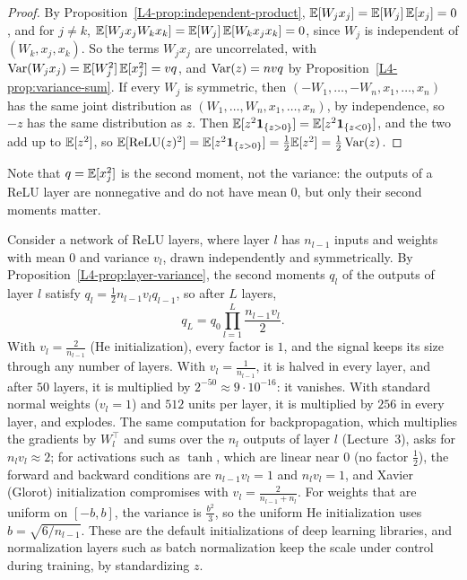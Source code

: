 \begin{proof}
    By Proposition~\ref{L4-prop:independent-product}, $\mathbb{E}[W_jx_j] = \mathbb{E}[W_j]\,\mathbb{E}[x_j] = 0$, and for $j \neq k$, $\mathbb{E}[W_jx_jW_kx_k] = \mathbb{E}[W_j]\,\mathbb{E}[W_kx_jx_k] = 0$, since $W_j$ is independent of $(W_k, x_j, x_k)$. So the terms $W_jx_j$ are uncorrelated, with $\operatorname{Var}(W_jx_j) = \mathbb{E}[W_j^2]\,\mathbb{E}[x_j^2] = vq$, and $\operatorname{Var}(z) = nvq$ by Proposition~\ref{L4-prop:variance-sum}. If every $W_j$ is symmetric, then $(-W_1, \ldots, -W_n, x_1, \ldots, x_n)$ has the same joint distribution as $(W_1, \ldots, W_n, x_1, \ldots, x_n)$, by independence, so $-z$ has the same distribution as $z$. Then $\mathbb{E}[z^2\mathbf{1}_{\{z > 0\}}] = \mathbb{E}[z^2\mathbf{1}_{\{z < 0\}}]$, and the two add up to $\mathbb{E}[z^2]$, so $\mathbb{E}[\mathrm{ReLU}(z)^2] = \mathbb{E}[z^2\mathbf{1}_{\{z > 0\}}] = \frac{1}{2}\mathbb{E}[z^2] = \frac{1}{2}\operatorname{Var}(z)$.
\end{proof}

Note that $q = \mathbb{E}[x_j^2]$ is the second moment, not the variance: the outputs of a ReLU layer are nonnegative and do not have mean $0$, but only their second moments matter.

\begin{example}\label{L4-ex:initialization}
    Consider a network of ReLU layers, where layer $l$ has $n_{l-1}$ inputs and weights with mean $0$ and variance $v_l$, drawn independently and symmetrically. By Proposition~\ref{L4-prop:layer-variance}, the second moments $q_l$ of the outputs of layer $l$ satisfy $q_l = \frac{1}{2}n_{l-1}v_lq_{l-1}$, so after $L$ layers,
    \[q_L = q_0\prod_{l=1}^L \frac{n_{l-1}v_l}{2}.\]
    With $v_l = \frac{2}{n_{l-1}}$ (He initialization), every factor is $1$, and the signal keeps its size through any number of layers. With $v_l = \frac{1}{n_{l-1}}$, it is halved in every layer, and after $50$ layers, it is multiplied by $2^{-50} \approx 9 \cdot 10^{-16}$: it vanishes. With standard normal weights ($v_l = 1$) and $512$ units per layer, it is multiplied by $256$ in every layer, and explodes. The same computation for backpropagation, which multiplies the gradients by $W_l^\top$ and sums over the $n_l$ outputs of layer $l$ (Lecture~3), asks for $n_lv_l \approx 2$; for activations such as $\tanh$, which are linear near $0$ (no factor $\frac{1}{2}$), the forward and backward conditions are $n_{l-1}v_l = 1$ and $n_lv_l = 1$, and Xavier (Glorot) initialization compromises with $v_l = \frac{2}{n_{l-1} + n_l}$. For weights that are uniform on $[-b, b]$, the variance is $\frac{b^2}{3}$, so the uniform He initialization uses $b = \sqrt{6/n_{l-1}}$. These are the default initializations of deep learning libraries, and normalization layers such as batch normalization keep the scale under control during training, by standardizing $z$.
\end{example}

